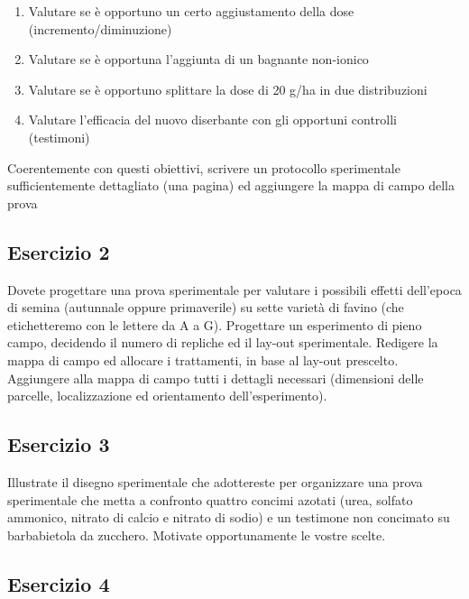 \documentclass[a4paper,12pt,oneside]{book}
\providecommand{\tightlist}{%
  \setlength{\itemsep}{0pt}\setlength{\parskip}{0pt}}
\begin{document}
\begin{enumerate}
\def\labelenumi{\arabic{enumi}.}
\tightlist
\item
  Valutare se è opportuno un certo aggiustamento della dose (incremento/diminuzione)
\item
  Valutare se è opportuna l'aggiunta di un bagnante non-ionico
\item
  Valutare se è opportuno splittare la dose di 20 g/ha in due distribuzioni
\item
  Valutare l'efficacia del nuovo diserbante con gli opportuni controlli (testimoni)
\end{enumerate}

Coerentemente con questi obiettivi, scrivere un protocollo sperimentale sufficientemente dettagliato (una pagina) ed aggiungere la mappa di campo della prova

\hypertarget{esercizio-2}{%
\subsection{Esercizio 2}\label{esercizio-2}}

Dovete progettare una prova sperimentale per valutare i possibili effetti dell'epoca di semina (autunnale oppure primaverile) su sette varietà di favino (che etichetteremo con le lettere da A a G). Progettare un esperimento di pieno campo, decidendo il numero di repliche ed il lay-out sperimentale. Redigere la mappa di campo ed allocare i trattamenti, in base al lay-out prescelto. Aggiungere alla mappa di campo tutti i dettagli necessari (dimensioni delle parcelle, localizzazione ed orientamento dell'esperimento).

\hypertarget{esercizio-3}{%
\subsection{Esercizio 3}\label{esercizio-3}}

Illustrate il disegno sperimentale che adottereste per organizzare una prova sperimentale che metta a confronto quattro concimi azotati (urea, solfato ammonico, nitrato di calcio e nitrato di sodio) e un testimone non concimato su barbabietola da zucchero. Motivate opportunamente le vostre scelte.

\hypertarget{esercizio-4}{%
\subsection{Esercizio 4}\label{esercizio-4}}
\end{document}
